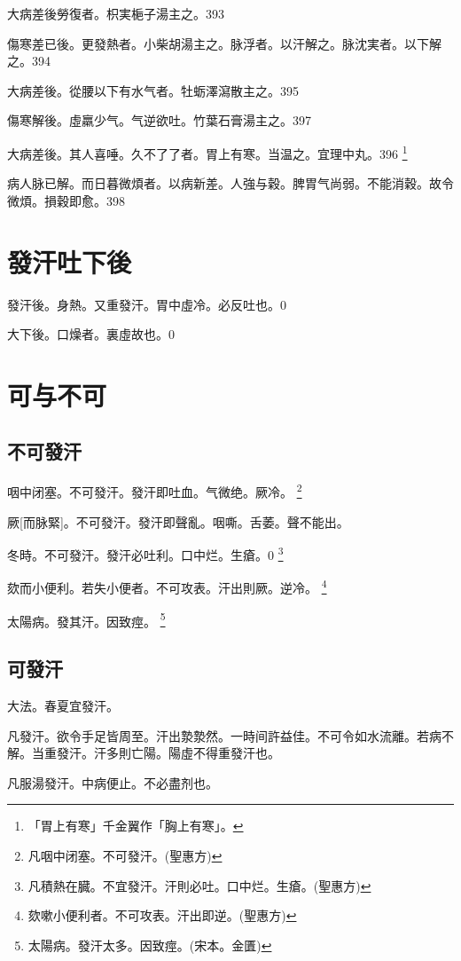 \documentclass[oneside,b4paper]{ctexbook}
\begin{document}
\begin{flushleft}
大病差後勞復者。枳実梔子湯主之。393

傷寒差已後。更發熱者。小柴胡湯主之。脉浮者。以汗解之。脉沈実者。以下解之。394

大病差後。從腰以下有水气者。牡蛎澤瀉散主之。395

傷寒解後。虛羸少气。气逆欲吐。竹葉石膏湯主之。397

大病差後。其人喜唾。久不了了者。胃上有寒。当温之。宜理中丸。396
\footnote{「胃上有寒」千金翼作「胸上有寒」。}

病人脉已解。而日暮微煩者。以病新差。人強与穀。脾胃气尚弱。不能消穀。故令微煩。損穀即愈。398

\chapter{發汗吐下後}

發汗後。身熱。又重發汗。胃中虛冷。必反吐也。0

大下後。口燥者。裏虛故也。0

\chapter{可与不可}

\section{不可發汗}

咽中闭塞。不可發汗。發汗即吐血。气微绝。厥冷。
\footnote{凡咽中闭塞。不可發汗。(聖惠方)}

厥[而脉緊]。不可發汗。發汗即聲亂。咽嘶。舌萎。聲不能出。

冬時。不可發汗。發汗必吐利。口中烂。生瘡。0
\footnote{凡積熱在臓。不宜發汗。汗則必吐。口中烂。生瘡。(聖惠方)}

欬而小便利。若失小便者。不可攻表。汗出則厥。逆冷。
\footnote{欬嗽小便利者。不可攻表。汗出即逆。(聖惠方)}

太陽病。發其汗。因致痙。
\footnote{太陽病。發汗太多。因致痙。(宋本。金匱)}

\section{可發汗}

大法。春夏宜發汗。

凡發汗。欲令手足皆周至。汗出漐漐然。一時间許益佳。不可令如水流離。若病不解。当重發汗。汗多則亡陽。陽虛不得重發汗也。

凡服湯發汗。中病便止。不必盡剂也。


\end{flushleft}
\end{document}
